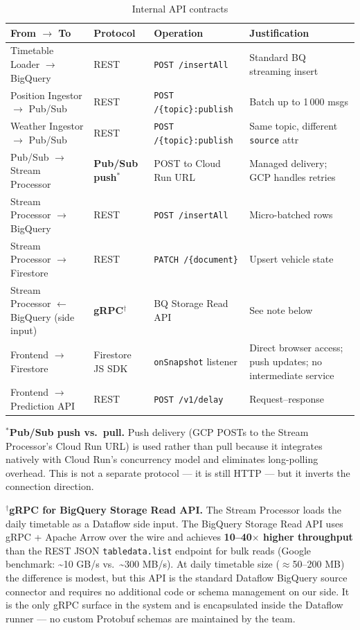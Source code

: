 \documentclass[11pt,a4paper]{article}
\newcommand{\hd}[1]{\textbf{\small #1}}
\begin{document}
\begin{table}[H]
\centering
\caption{Internal API contracts}
\renewcommand{\arraystretch}{1.38}
\begin{tabularx}{\linewidth}{L{3.0cm} C{2.0cm} L{3.4cm} X}
\toprule
\hd{From $\to$ To} & \hd{Protocol} & \hd{Operation} & \hd{Justification} \\
\midrule
{}
Timetable Loader $\to$ BigQuery
  & REST & \texttt{POST /insertAll}
  & Standard BQ streaming insert \\
Position Ingestor $\to$ Pub/Sub
  & REST & \texttt{POST /\{topic\}:publish}
  & Batch up to 1\,000 msgs \\
Weather Ingestor $\to$ Pub/Sub
  & REST & \texttt{POST /\{topic\}:publish}
  & Same topic, different \texttt{source} attr \\
Pub/Sub $\to$ Stream Processor
  & \textbf{Pub/Sub push}$^{*}$
  & POST to Cloud Run URL
  & Managed delivery; GCP handles retries \\
Stream Processor $\to$ BigQuery
  & REST & \texttt{POST /insertAll}
  & Micro-batched rows \\
Stream Processor $\to$ Firestore
  & REST & \texttt{PATCH /\{document\}}
  & Upsert vehicle state \\
Stream Processor $\leftarrow$ BigQuery (side input)
  & \textbf{gRPC}$^{\dagger}$
  & BQ Storage Read API
  & See note below \\
Frontend $\to$ Firestore
  & Firestore JS SDK & \texttt{onSnapshot} listener
  & Direct browser access; push updates; no intermediate service \\
Frontend $\to$ Prediction API
  & REST & \texttt{POST /v1/delay}
  & Request--response \\
\bottomrule
\end{tabularx}
\end{table}

\noindent
$^{*}$\textbf{Pub/Sub push vs.\ pull.}
Push delivery (GCP POSTs to the Stream Processor's Cloud Run URL) is used
rather than pull because it integrates natively with Cloud Run's concurrency
model and eliminates long-polling overhead.
This is not a separate protocol --- it is still HTTP --- but it inverts
the connection direction.

\noindent
$^{\dagger}$\textbf{gRPC for BigQuery Storage Read API.}
The Stream Processor loads the daily timetable as a Dataflow side input.
The BigQuery Storage Read API uses gRPC + Apache Arrow over the wire and
achieves \textbf{10--40$\times$ higher throughput} than the REST JSON
\texttt{tabledata.list} endpoint for bulk reads
(Google benchmark: \textasciitilde{}10 GB/s vs.\ \textasciitilde{}300 MB/s).
At daily timetable size ($\approx$50--200 MB) the difference is modest, but
this API is the standard Dataflow BigQuery source connector and requires no
additional code or schema management on our side.
It is the only gRPC surface in the system and is encapsulated inside the
Dataflow runner --- no custom Protobuf schemas are maintained by the team.
\end{document}
